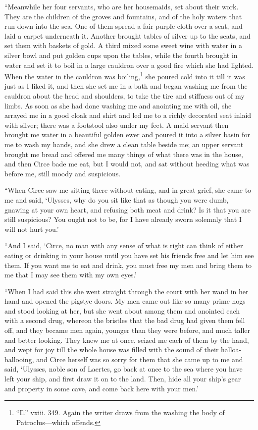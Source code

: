 “Meanwhile her four servants, who are her housemaids, set about their work.
They are the children of the groves and fountains, and of the holy waters that
run down into the sea. One of them spread a fair purple cloth over a seat, and
laid a carpet underneath it. Another brought tables of silver up to the seats,
and set them with baskets of gold. A third mixed some sweet wine with water in
a silver bowl and put golden cups upon the tables, while the fourth brought in
water and set it to boil in a large cauldron over a good fire which she had
lighted. When the water in the cauldron was boiling,\footnote{“Il.” vxiii. 349. Again the writer draws from the washing the body of
Patroclus—which offends.} she poured cold into it till it was
just as I liked it, and then she set me in a bath and began washing me from the
cauldron about the head and shoulders, to take the tire and stiffness out of my
limbs. As soon as she had done washing me and anointing me with oil, she
arrayed me in a good cloak and shirt and led me to a richly decorated seat
inlaid with silver; there was a footstool also under my feet. A maid servant
then brought me water in a beautiful golden ewer and poured it into a silver
basin for me to wash my hands, and she drew a clean table beside me; an upper
servant brought me bread and offered me many things of what there was in the
house, and then Circe bade me eat, but I would not, and sat without heeding
what was before me, still moody and suspicious.

“When Circe saw me sitting there without eating, and in great grief, she came
to me and said, ‘Ulysses, why do you sit like that as though you were dumb,
gnawing at your own heart, and refusing both meat and drink? Is it that you are
still suspicious? You ought not to be, for I have already sworn solemnly that I
will not hurt you.’

“And I said, ‘Circe, no man with any sense of what is right can think of either
eating or drinking in your house until you have set his friends free and let
him see them. If you want me to eat and drink, you must free my men and bring
them to me that I may see them with my own eyes.’

“When I had said this she went straight through the court with her wand in her
hand and opened the pigstye doors. My men came out like so many prime hogs and
stood looking at her, but she went about among them and anointed each with a
second drug, whereon the bristles that the bad drug had given them fell off,
and they became men again, younger than they were before, and much taller and
better looking. They knew me at once, seized me each of them by the hand, and
wept for joy till the whole house was filled with the sound of their
halloa-ballooing, and Circe herself was so sorry for them that she came up to
me and said, ‘Ulysses, noble son of Laertes, go back at once to the sea where
you have left your ship, and first draw it on to the land. Then, hide all your
ship’s gear and property in some cave, and come back here with your men.’

